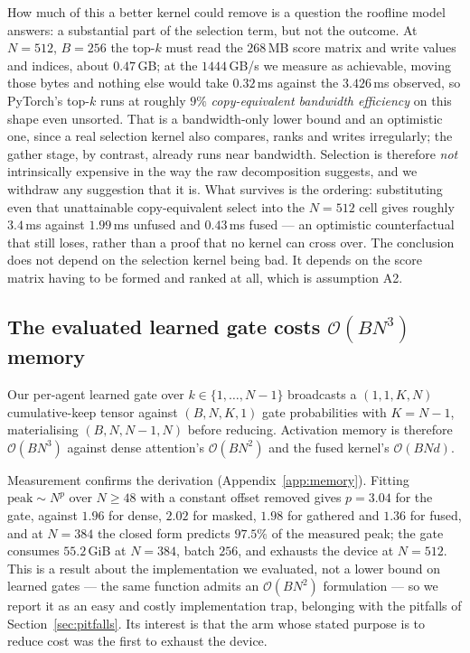 How much of this a better kernel could remove is a question the roofline model
answers: a substantial part of the selection term, but not the outcome. At
$N{=}512$, $B{=}256$ the top-$k$ must read the $268$\,MB score matrix and write
values and indices, about $0.47$\,GB; at the $1444$\,GB/s we measure as
achievable, moving those bytes and nothing else would take $0.32$\,ms against
the $3.426$\,ms observed, so PyTorch's top-$k$ runs at roughly $9\%$
\emph{copy-equivalent bandwidth efficiency} on this shape even unsorted. That
is a bandwidth-only lower bound and an optimistic one, since a real selection
kernel also compares, ranks and writes irregularly; the gather stage, by
contrast, already runs near bandwidth. Selection is therefore \emph{not}
intrinsically expensive in the way the raw decomposition suggests, and we
withdraw any suggestion that it is. What survives is the ordering: substituting
even that unattainable copy-equivalent select into the $N{=}512$ cell gives
roughly $3.4$\,ms against $1.99$\,ms unfused and $0.43$\,ms fused --- an
optimistic counterfactual that still loses, rather than a proof that no kernel
can cross over. The conclusion does not depend on the selection kernel being
bad. It depends on the score matrix having to be formed and ranked at all,
which is assumption A2.

\subsection{\texorpdfstring{The evaluated learned gate costs $\mathcal{O}(BN^3)$ memory}{The evaluated learned gate costs O(BN cubed) memory}}
\label{sec:memory}

Our per-agent learned gate over $k \in \{1,\dots,N-1\}$ broadcasts a
$(1,1,K,N)$ cumulative-keep tensor against $(B,N,K,1)$ gate probabilities with
$K = N-1$, materialising $(B,N,N-1,N)$ before reducing. Activation memory is
therefore $\mathcal{O}(BN^3)$ against dense attention's $\mathcal{O}(BN^2)$ and
the fused kernel's $\mathcal{O}(BNd)$.

Measurement confirms the derivation (Appendix~\ref{app:memory}). Fitting
$\text{peak} \sim N^p$ over $N \ge 48$ with a constant offset removed gives
$p = 3.04$ for the gate, against $1.96$ for dense, $2.02$ for masked, $1.98$ for
gathered and $1.36$ for fused, and at $N{=}384$ the closed form predicts
$97.5\%$ of the measured peak; the gate consumes $55.2$\,GiB at $N{=}384$,
batch $256$, and exhausts the device at $N{=}512$. This is a result about the
implementation we evaluated, not a lower bound on learned gates --- the same
function admits an $\mathcal{O}(BN^2)$ formulation --- so we report it as an
easy and costly implementation trap, belonging with the pitfalls of
Section~\ref{sec:pitfalls}. Its interest is that the arm whose stated purpose
is to reduce cost was the first to exhaust the device.

